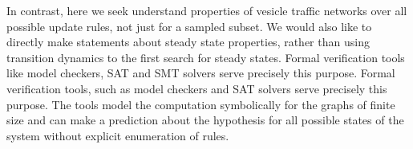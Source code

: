 %
%
%
%
%
%
%
%

In contrast, here we seek understand properties of vesicle traffic networks over all possible update rules, not just for a sampled subset. 
%
We would also like to directly make statements about steady state properties, rather
than using transition dynamics to the first search for steady states. 
%
Formal verification tools like model checkers, SAT and SMT solvers serve precisely this purpose. 
%
Formal verification tools, such as model checkers
\cite{clarke1996symbolic, biere2003bounded, clarke2008birth,
	cimatti2000nusmv, holzmann1997model} and SAT solvers
\cite{moskewicz2001chaff,een2004extensible} serve precisely this
purpose.
%
The tools model the computation symbolically for the graphs of finite size and can make a prediction about the hypothesis for all possible states of the system without explicit enumeration of rules. 
%

